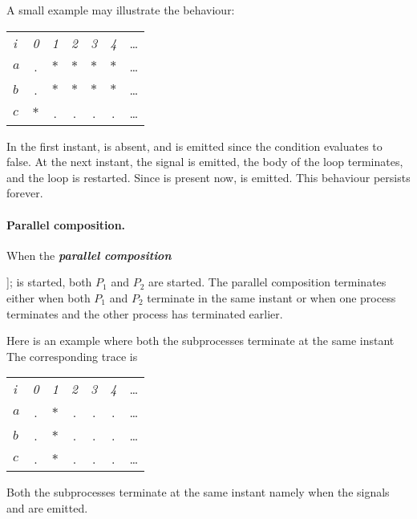 A small example
%
%
may illustrate the behaviour:
\begin{center}
  \leavevmode
  \begin{tabular}[]{l@{\quad}||@{\quad} cccccc}
    \hline\hline   
     \hbox{{\footnotesize \textit{i}}} &{\footnotesize \textit{0}}
     &{\footnotesize \textit{1}}&{\footnotesize \textit{2}}
     &{\footnotesize \textit{3}}&{\footnotesize \textit{4}}&\ldots
   \\  
    \hbox{$a$} &.&$*$&$*$&$*$&$*$&\ldots
   \\
    \hbox{$b$} &.&$*$&$*$&$*$&$*$&\ldots
   \\
    \hbox{$c$} &$*$&.&.&.&.&\ldots
    \\   
    \hline\hline
  \end{tabular}
\end{center}
In the first instant,  is absent, and  is emitted since
the condition evaluates to false. At the next instant,
the signal  is emitted, the body of the loop terminates, and the loop
is restarted. Since  is present now,  is emitted. This behaviour
persists forever.

\paragraph{Parallel composition.}When the \textbf{\emph{parallel composition}}
 
% 
\BEP
                   [[ $P_{1}$ || $P_{2}$ ]];
\EEP
% 
is started, both $P_{1}$ and $P_{2}$ are started.  The parallel
composition terminates either when both $P_{1}$ and $P_{2}$ terminate 
in the same instant or when one process terminates and the other process
has terminated earlier.

Here is an example where both the subprocesses terminate at the same instant
%
%
The corresponding trace is
\begin{center}
  \leavevmode
  \begin{tabular}[]{l@{\quad}||@{\quad} cccccc}
    \hline\hline   
     \hbox{{\footnotesize \textit{i}}} &{\footnotesize \textit{0}}
     &{\footnotesize \textit{1}}&{\footnotesize \textit{2}}
     &{\footnotesize \textit{3}}&{\footnotesize \textit{4}}&\ldots
   \\  
    \hbox{$a$} &.&$*$&.&.&.&\ldots
   \\
    \hbox{$b$} &.&$*$&.&.&.&\ldots
   \\
    \hbox{$c$} &.&$*$&.&.&.&\ldots
    \\   
    \hline\hline
  \end{tabular}
\end{center}
Both the subprocesses terminate at the same instant namely when
the signals  and  are emitted.

